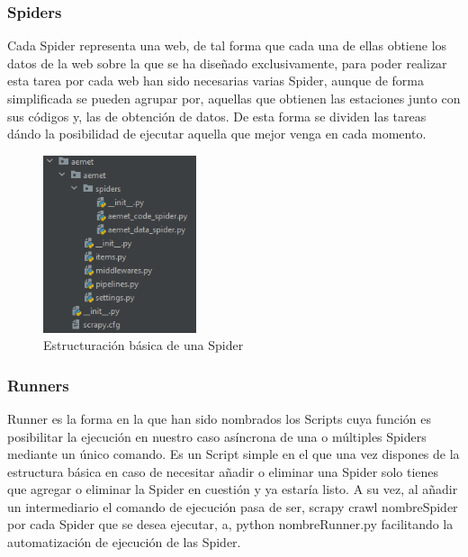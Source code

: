 \subsubsection{Spiders}
Cada Spider representa una web, de tal forma que cada una de ellas obtiene los datos de la web sobre la que se ha diseñado exclusivamente, para poder realizar esta tarea por cada web han sido necesarias varias Spider, aunque de forma simplificada se pueden agrupar por, aquellas que obtienen las estaciones junto con sus códigos y, las de obtención de datos.\newline
\newline
De esta forma se dividen las tareas dándo la posibilidad de ejecutar aquella que mejor venga en cada momento.

\begin{figure} [H]
	\centering
	\includegraphics[width=0.4\textwidth]{fig/estructura_basica_spider.png}
	\caption[Estructuración básica de una Spider]{Estructuración básica de una Spider}
	\label{fig:ej8}
\end{figure}

\subsubsection{Runners}
Runner es la forma en la que han sido nombrados los Scripts cuya función es posibilitar la ejecución en nuestro caso asíncrona de una o múltiples Spiders mediante un único comando.\newline
\newline
Es un Script simple en el que una vez dispones de la estructura básica en caso de necesitar añadir o eliminar una Spider solo tienes que agregar o eliminar la Spider en cuestión y ya estaría listo.\newline
\newline
A su vez, al añadir un intermediario el comando de ejecución pasa de ser, scrapy crawl nombreSpider por cada Spider que se desea ejecutar, a, python nombreRunner.py facilitando la automatización de ejecución de las Spider.

